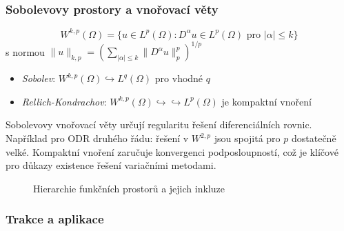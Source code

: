 \subsubsection{Sobolevovy prostory a vnořovací věty}

\begin{definition}
\[
W^{k,p}(\Omega) = \{ u \in L^p(\Omega) : D^\alpha u \in L^p(\Omega) \text{ pro } |\alpha| \leq k \}
\]
s normou $\|u\|_{k,p} = \left( \sum_{|\alpha| \leq k} \|D^\alpha u\|_p^p \right)^{1/p}$
\end{definition}

\begin{theorem}
\begin{itemize}
\item \emph{Sobolev}: $W^{k,p}(\Omega) \hookrightarrow L^q(\Omega)$ pro vhodné $q$
\item \emph{Rellich-Kondrachov}: $W^{k,p}(\Omega) \hookrightarrow\hookrightarrow L^p(\Omega)$ je kompaktní vnoření
\end{itemize}
\end{theorem}

\begin{keyinsight}
Sobolevovy vnořovací věty určují regularitu řešení diferenciálních rovnic. Například pro ODR druhého řádu: řešení v $W^{2,p}$ jsou spojitá pro $p$ dostatečně velké. Kompaktní vnoření zaručuje konvergenci podposloupností, což je klíčové pro důkazy existence řešení variačními metodami.
\end{keyinsight}

\begin{figure}[h]
\centering
{}
\caption{Hierarchie funkčních prostorů a jejich inkluze}
\label{fig:prostorova-hierarchie}
\end{figure}

\subsubsection{Trakce a aplikace}


